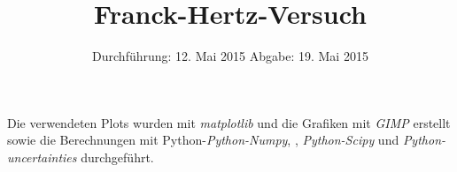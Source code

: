 
\subject{Anfängerpraktikum V601}
\title{Franck-Hertz-Versuch}
\date{
  Durchführung: 12. Mai 2015
  \hspace{1em}
  Abgabe: 19. Mai 2015
}


\maketitle
\thispagestyle{empty}
\newpage





\newpage
\printbibliography
Die verwendeten Plots wurden mit \textit{matplotlib}\cite{matplotlib} und die Grafiken mit \textit{GIMP}\cite{gimp} erstellt sowie die Berechnungen mit Python-\textit{Python-Numpy}, \cite{numpy}, \textit{Python-Scipy}\cite{scipy} und \textit{Python-uncertainties}\cite{uncertainties} durchgeführt.

